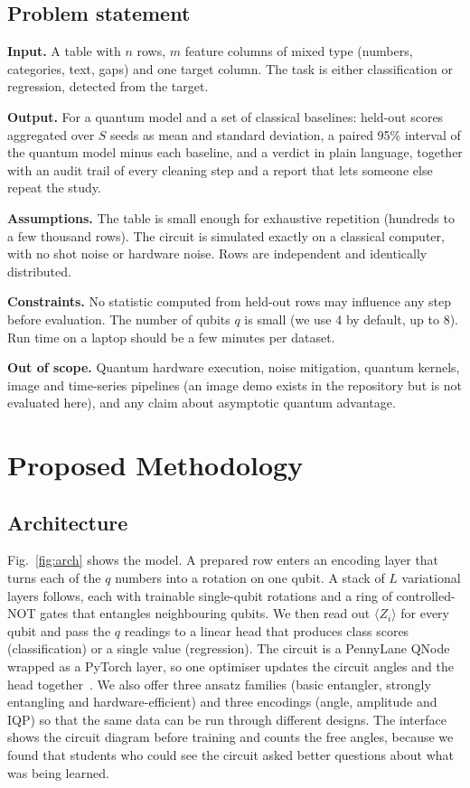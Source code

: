 \documentclass[12pt,onecolumn,draftclsnofoot]{IEEEtran}
\begin{document}
\subsection{Problem statement}
\textbf{Input.} A table with $n$ rows, $m$ feature columns of mixed type (numbers, categories, text, gaps) and one target column. The task is either classification or regression, detected from the target.

\textbf{Output.} For a quantum model and a set of classical baselines: held-out scores aggregated over $S$ seeds as mean and standard deviation, a paired 95\% interval of the quantum model minus each baseline, and a verdict in plain language, together with an audit trail of every cleaning step and a report that lets someone else repeat the study.

\textbf{Assumptions.} The table is small enough for exhaustive repetition (hundreds to a few thousand rows). The circuit is simulated exactly on a classical computer, with no shot noise or hardware noise. Rows are independent and identically distributed.

\textbf{Constraints.} No statistic computed from held-out rows may influence any step before evaluation. The number of qubits $q$ is small (we use 4 by default, up to 8). Run time on a laptop should be a few minutes per dataset.

\textbf{Out of scope.} Quantum hardware execution, noise mitigation, quantum kernels, image and time-series pipelines (an image demo exists in the repository but is not evaluated here), and any claim about asymptotic quantum advantage.

\section{Proposed Methodology}
\subsection{Architecture}
Fig.~\ref{fig:arch} shows the model. A prepared row enters an encoding layer that turns each of the $q$ numbers into a rotation on one qubit. A stack of $L$ variational layers follows, each with trainable single-qubit rotations and a ring of controlled-NOT gates that entangles neighbouring qubits. We then read out $\langle Z_i\rangle$ for every qubit and pass the $q$ readings to a linear head that produces class scores (classification) or a single value (regression). The circuit is a PennyLane QNode wrapped as a PyTorch layer, so one optimiser updates the circuit angles and the head together~\cite{bergholm2018pennylane,paszke2019pytorch}. We also offer three ansatz families (basic entangler, strongly entangling and hardware-efficient) and three encodings (angle, amplitude and IQP) so that the same data can be run through different designs. The interface shows the circuit diagram before training and counts the free angles, because we found that students who could see the circuit asked better questions about what was being learned.
\end{document}
